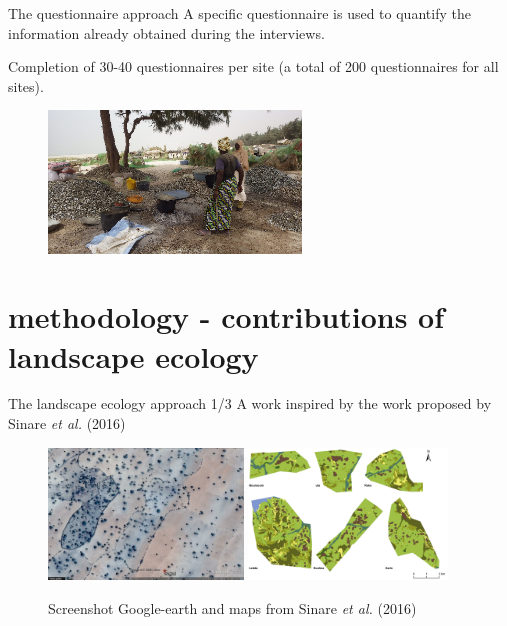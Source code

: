 \documentclass[newPxFont]{beamer}
\begin{document}
\begin{frame}[c]{The questionnaire approach}
\vspace{-1cm}
A specific questionnaire is used to quantify the information already obtained during the interviews.

Completion of 30-40 questionnaires per site (a total of 200 questionnaires for all sites).
\begin{figure}
	\centering
	\includegraphics[width = 0.6\textwidth]{img/Khoudia.png}
\end{figure}

\end{frame}

\section{methodology - contributions of landscape ecology}

\begin{frame}[c]{The landscape ecology approach 1/3}
\vspace{-1cm}
A work inspired by the work proposed by Sinare \textit{et al.} (2016)
\begin{figure}
	\centering
	\includegraphics[height = 3.5cm]{img/ggearth}
  \includegraphics[height = 3.5cm]{img/Sinare_et_al2016}
  \caption{\small{Screenshot Google-earth and maps from Sinare \textit{et al.} (2016)}}
\end{figure}
\end{frame}
\end{document}
